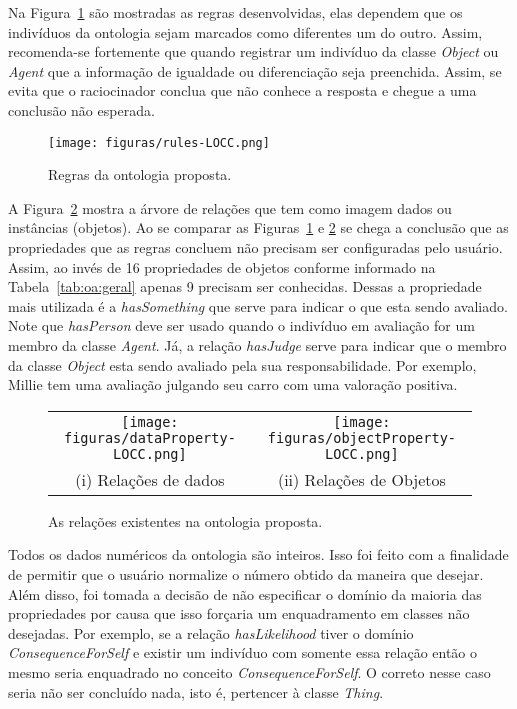 Na Figura~\ref{fig:rlocc} são mostradas as regras desenvolvidas, elas dependem
que os indivíduos da ontologia sejam marcados como diferentes um do outro.
Assim, recomenda-se fortemente que quando registrar um indivíduo da classe
\emph{Object} ou \emph{Agent} que a informação de igualdade ou diferenciação
seja preenchida\dev{}. Assim, se evita que o raciocinador conclua que não
conhece a resposta e chegue a uma conclusão não esperada.

\begin{figure}[t]
  \centering
  \texttt{[image: figuras/rules-LOCC.png]}
  \caption{Regras da ontologia proposta.}
  \label{fig:rlocc}
\end{figure}

A Figura~\ref{fig:kplocc} mostra a árvore de relações que tem como imagem
dados ou instâncias (objetos). Ao se comparar as Figuras~\ref{fig:rlocc}
e \ref{fig:kplocc} se chega a conclusão que as propriedades que as
regras concluem não precisam ser configuradas pelo usuário. Assim, ao invés de
16 propriedades de objetos conforme informado na Tabela~\ref{tab:oa:geral}
apenas 9 precisam ser conhecidas. Dessas a propriedade mais utilizada é a
\emph{hasSomething} que serve para indicar o que esta sendo avaliado. Note que
\emph{hasPerson} deve ser usado quando o indivíduo em avaliação for um membro
da classe \emph{Agent}. Já, a relação \emph{hasJudge} serve para indicar que o
membro da classe \emph{Object} esta sendo avaliado pela sua responsabilidade.
Por exemplo, Millie tem uma avaliação julgando seu carro com uma valoração
positiva.

\begin{figure}[b]
  \centering
  \begin{tabular}{cc}
  \texttt{[image: figuras/dataProperty-LOCC.png]} & \texttt{[image: figuras/objectProperty-LOCC.png]} \\
  (i) Relações de dados & (ii) Relações de Objetos
  \end{tabular}
  \caption{As relações existentes na ontologia proposta.}
  \label{fig:kplocc}
\end{figure}

Todos os dados numéricos da ontologia são inteiros. Isso foi feito com a
finalidade de permitir que o usuário normalize\dev{} o número obtido da
maneira que desejar. Além disso, foi tomada a decisão de não especificar o
domínio da maioria das propriedades por causa que isso forçaria um
enquadramento em classes não desejadas. Por exemplo, se a relação
\emph{hasLikelihood} tiver o domínio \emph{ConsequenceForSelf} e existir um
indivíduo com somente essa relação então o mesmo seria enquadrado no conceito
\emph{ConsequenceForSelf}. O correto nesse caso seria não ser concluído nada,
isto é, pertencer à classe \emph{Thing}.

